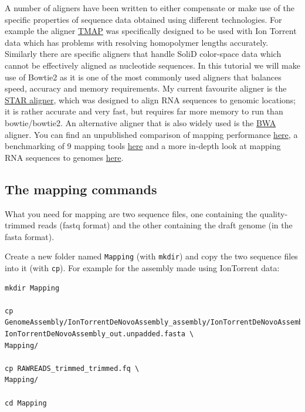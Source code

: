 \documentclass[11pt]{article}
\begin{document}
A number of aligners have been written to either compensate or make use of
the specific properties of sequence data obtained using different
technologies. For example the aligner \href{https://www.google.no/url?sa=t&rct=j&q=&esrc=s&source=web&cd=5&ved=0CD4QFjAE&url=https\%3A\%2F\%2Fgithub.com\%2Fiontorrent\%2FTMAP&ei=1u07VZCXFYGqywPBz4DoDg&usg=AFQjCNE3vZXuQ1ygljhBcrozKj_nBU84TQ&sig2=u5_YVYBE904ay-9oLUuMOQ&bvm=bv.91665533,d.bGQ}{TMAP} was specifically
designed to be used with Ion Torrent data which has problems with resolving
homopolymer lengths accurately. Similarly there are specific aligners that
handle SoliD color-space data which cannot be effectively aligned as
nucleotide sequences. In this tutorial we will make use of Bowtie2 as it is
one of the most commonly used aligners that balances speed, accuracy and
memory requirements. My current favourite aligner is the \href{http://bioinformatics.oxfordjournals.org/content/early/2012/10/25/bioinformatics.bts635}{STAR aligner}, which
was designed to align RNA sequences to genomic locations; it is rather
accurate and very fast, but requires far more memory to run than bowtie/bowtie2.
An alternative aligner that is also widely used is the \href{http://bio-bwa.sourceforge.net/}{BWA} aligner. You can
find an unpublished comparison of mapping performance \href{http://genomespot.blogspot.no/2014/11/dna-aligner-accuracy-bwa-bowtie-soap.html}{here}, a benchmarking of
9 mapping tools \href{http://bmcbioinformatics.biomedcentral.com/articles/10.1186/1471-2105-14-184}{here} and a more in-depth look at mapping RNA sequences to genomes \href{http://www.nature.com/nmeth/journal/v10/n12/full/nmeth.2722.html}{here}.

\subsection{The mapping commands}
\label{sec:orgheadline1}

What you need for mapping are two sequence files, one containing the
quality-trimmed reads (fastq format) and the other containing the draft genome
(in the fasta format).

Create a new folder named \texttt{Mapping} (with \texttt{mkdir}) and copy the two
sequence files into it (with \texttt{cp}). For example for the assembly made using
IonTorrent data:


\begin{verbatim}
mkdir Mapping

cp GenomeAssembly/IonTorrentDeNovoAssembly_assembly/IonTorrentDeNovoAssembly_d_results/\
IonTorrentDeNovoAssembly_out.unpadded.fasta \
Mapping/

cp RAWREADS_trimmed_trimmed.fq \
Mapping/

cd Mapping
\end{verbatim}
\end{document}

